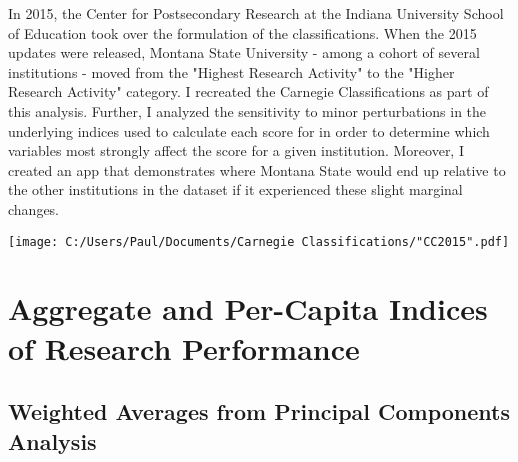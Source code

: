 \documentclass[a0,portrait]{a0poster}
\begin{document}
\begin{multicols}{2}
In 2015, the Center for Postsecondary Research at the Indiana University School of Education took over the formulation of the classifications. When the 2015 updates were released, Montana State University - among a cohort of several institutions - moved from the "Highest Research Activity" to the "Higher Research Activity" category. I recreated the Carnegie Classifications as part of this analysis. Further, I analyzed the sensitivity to minor perturbations in the underlying indices used to calculate each score for in order to determine which variables most strongly affect the score for a given institution.  Moreover, I created an app that demonstrates where Montana State would end up relative to the other institutions in the dataset if it experienced these slight marginal changes. 


\begin{center}\vspace{1cm}
	\texttt{[image: C:/Users/Paul/Documents/Carnegie Classifications/"CC2015".pdf]}
\end{center}\vspace{1cm}

%
%
%
\color{DarkSlateGray}
\section*{Aggregate and Per-Capita Indices of Research Performance}

\subsection*{Weighted Averages from Principal Components Analysis}


\end{multicols}
\end{document}

